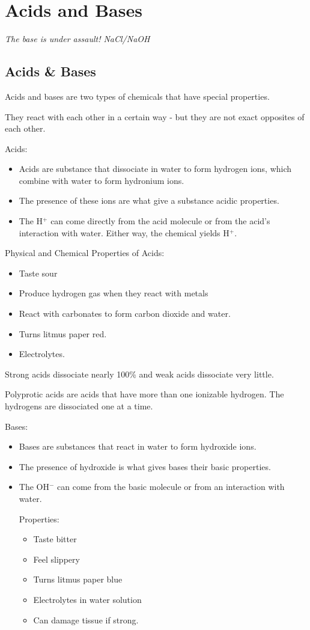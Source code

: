 \documentclass[../hchem.tex]{subfiles}
\begin{document}
\chapter{Acids and Bases}
\textit{The base is under assault! NaCl/NaOH}
\section{Acids \& Bases}
Acids and bases are two types of chemicals that have special properties.

They react with each other in a certain way - but they are not exact opposites of each other.

Acids:
\begin{itemize}
    \item Acids are substance that dissociate in water to form hydrogen ions, which combine with water to form hydronium ions.
    \item The presence of these ions are what give a substance acidic properties.
    \item The H$^+$ can come directly from the acid molecule or from the acid's interaction with water. Either way, the chemical yields H$^+$.
\end{itemize}

Physical and Chemical Properties of Acids:
\begin{itemize}
    \item Taste sour 
    \item Produce hydrogen gas when they react with metals 
    \item React with carbonates to form carbon dioxide and water.
    \item Turns litmus paper red.
    \item Electrolytes.
\end{itemize}

Strong acids dissociate nearly 100\% and weak acids dissociate very little.

Polyprotic acids are acids that have more than one ionizable hydrogen. The hydrogens are dissociated one at a time.

Bases:
\begin{itemize}
    \item Bases are substances that react in water to form hydroxide ions.
    \item The presence of hydroxide is what gives bases their basic properties.
    \item The OH$^-$ can come from the basic molecule or from an interaction with water.
    
    Properties:
    \begin{itemize}
        \item Taste bitter 
        \item Feel slippery
        \item Turns litmus paper blue 
        \item Electrolytes in water solution 
        \item Can damage tissue if strong.
    \end{itemize}
\end{itemize}
\end{document}
